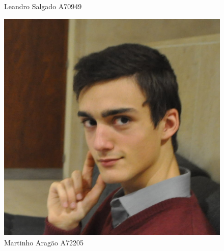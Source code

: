 \documentclass[10pt] {article}
\begin{document}
\begin{figure}[!htb]
  \caption{Leandro Salgado A70949}\label{fig:awesome_image2}
\endminipage\hfill
{}%
  \includegraphics[width=\linewidth]{ma.jpg}
  \caption{Martinho Aragão A72205}
\endminipage
\end{figure}

\newpage

\tableofcontents

\newpage
\end{document}
